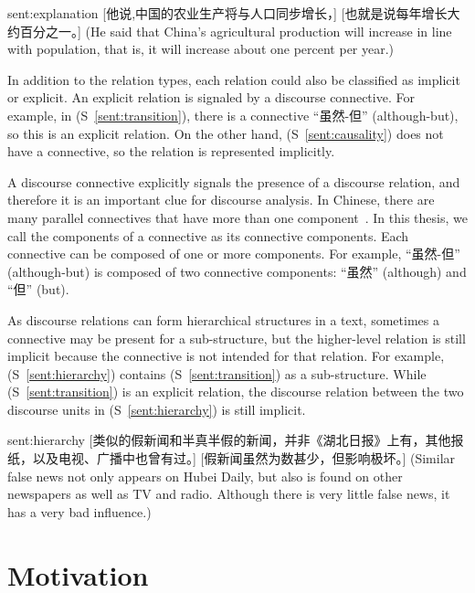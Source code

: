 \begin{sent}{sent:explanation}{}
    [他说,中国的农业生产将与人口同步增长，] [也就是说每年增长大约百分之一。]
    (He said that China's agricultural production will increase in line with
    population, that is, it will increase about one percent per year.)
\end{sent}

In addition to the relation types, each relation could also be classified
as implicit or explicit. An explicit relation is signaled by a discourse connective.
For example, in (S~\ref{sent:transition}), there is a connective ``虽然-但''
(although-but), so this is an explicit relation. On the other hand,
(S~\ref{sent:causality}) does not have a connective, so the relation
is represented implicitly.

A discourse connective explicitly signals the presence of a discourse relation,
and therefore it is an important clue for discourse analysis.
In Chinese, there are many parallel connectives that have more than one
component~\citep{zhou2012pdtb}.
In this thesis, we call the components of a connective as its connective components.
Each connective can be composed of one or more components. For example, ``虽然-但''
(although-but) is composed of two connective components: ``虽然'' (although)
and ``但'' (but).

As discourse relations can form hierarchical structures in a text, sometimes
a connective may be present for a sub-structure, but the higher-level relation
is still implicit because the connective is not intended for that relation.
For example, (S~\ref{sent:hierarchy}) contains (S~\ref{sent:transition})
as a sub-structure. While (S~\ref{sent:transition}) is an explicit relation,
the discourse relation between the two discourse units in (S~\ref{sent:hierarchy})
is still implicit.

\begin{sent}{sent:hierarchy}{}
    [类似的假新闻和半真半假的新闻，并非《湖北日报》上有，其他报纸，以及电视、广播中也曾有过。]
    [假新闻虽然为数甚少，但影响极坏。]
    (Similar false news not only appears on Hubei Daily, but also is found on
    other newspapers as well as TV and radio.
    Although there is very little false news, it has a very bad influence.)
\end{sent}



%
%
\section{Motivation}

